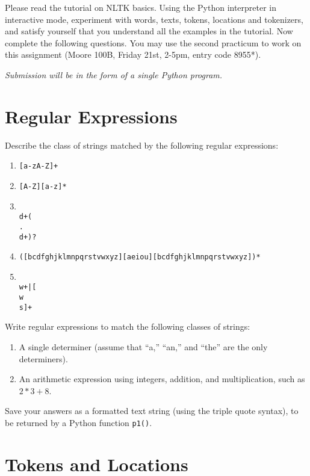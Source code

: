 \documentclass{cis530}
\begin{document}
\maketitle

Please read the tutorial on NLTK basics.
Using the Python interpreter in interactive mode, experiment
with words, texts, tokens, locations and tokenizers, and satisfy
yourself that you understand all the examples in the tutorial.
Now complete the following questions.
You may use the second practicum to work on this assignment
(Moore 100B, Friday 21st, 2-5pm, entry code 8955*).

\emph{Submission will be in the form of a single Python program.}

\section{Regular Expressions}

Describe the class of strings matched by the following regular expressions:
\begin{enumerate}
    \item \texttt{[a-zA-Z]+}
    \item \texttt{[A-Z][a-z]*}
    \item \texttt{\\d+(\\.\\d+)?}
    \item \texttt{([bcdfghjklmnpqrstvwxyz][aeiou][bcdfghjklmnpqrstvwxyz])*}
    \item \texttt{\\w+|[\^\\w\\s]+}
\end{enumerate}

Write regular expressions to match the following classes of strings:

\begin{enumerate}
    \item A single determiner (assume that ``a,'' ``an,'' and ``the''
    are the only determiners).  
    \item An arithmetic expression using integers, addition, and
    multiplication, such as $2*3+8$.
\end{enumerate}

Save your answers as a formatted text string (using the triple quote
syntax), to be returned by a Python function \texttt{p1()}.

\section{Tokens and Locations}
\end{document}
